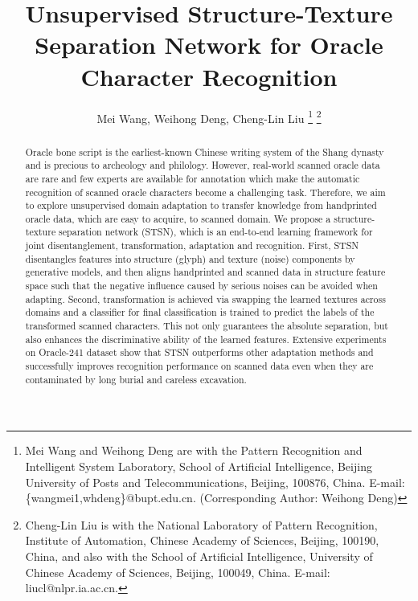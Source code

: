 \documentclass[10pt,journal,compsoc,twocolumn ]{IEEEtran}
\begin{document}
\title{Unsupervised Structure-Texture Separation Network for Oracle Character Recognition }

\author{Mei Wang, Weihong Deng, Cheng-Lin Liu
\thanks{Mei Wang and Weihong Deng are with the Pattern Recognition and Intelligent System Laboratory, School of Artificial Intelligence, Beijing University of Posts and Telecommunications, Beijing, 100876, China. E-mail: \{wangmei1,whdeng\}@bupt.edu.cn. (Corresponding Author: Weihong Deng)}
\thanks{Cheng-Lin Liu is with the National Laboratory of Pattern Recognition, Institute of Automation,
Chinese Academy of Sciences, Beijing, 100190, China, and also with the School of Artificial Intelligence, University of Chinese Academy of Sciences, Beijing, 100049, China. E-mail: liucl@nlpr.ia.ac.cn.}}

\maketitle


\begin{abstract}

Oracle bone script is the earliest-known Chinese writing system of the Shang dynasty and is precious to archeology and philology. However, real-world scanned oracle data are rare and few experts are available for annotation which make the automatic recognition of scanned oracle characters become a challenging task. Therefore, we aim to explore unsupervised domain adaptation to transfer knowledge from handprinted oracle data, which are easy to acquire, to scanned domain. We propose a structure-texture separation network (STSN), which is an end-to-end learning framework for joint disentanglement, transformation, adaptation and recognition. First, STSN disentangles features into structure (glyph) and texture (noise) components by generative models, and then aligns handprinted and scanned data in structure feature space such that the negative influence caused by serious noises can be avoided when adapting. Second, transformation is achieved via swapping the learned textures across domains and a classifier for final classification is trained to predict the labels of the transformed scanned characters. This not only guarantees the absolute separation, but also enhances the discriminative ability of the learned features. Extensive experiments on Oracle-241 dataset show that STSN outperforms other adaptation methods and successfully improves recognition performance on scanned data even when they are contaminated by long burial and careless excavation.

\end{abstract}
\end{document}
